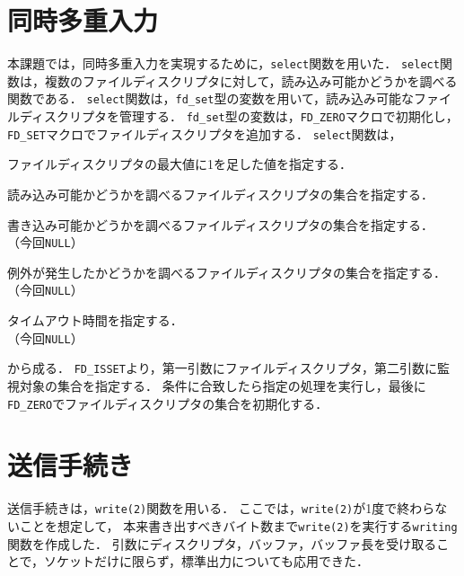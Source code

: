 \documentclass[12pt]{jlreq}
\begin{document}
\section*{同時多重入力}
本課題では，同時多重入力を実現するために，\texttt{select}関数を用いた．
\texttt{select}関数は，複数のファイルディスクリプタに対して，読み込み可能かどうかを調べる関数である．
\texttt{select}関数は，\texttt{fd\_set}型の変数を用いて，読み込み可能なファイルディスクリプタを管理する．
\texttt{fd\_set}型の変数は，\texttt{FD\_ZERO}マクロで初期化し，\texttt{FD\_SET}マクロでファイルディスクリプタを追加する．
\texttt{select}関数は，
\begin{description}
    \newcommand{\nulll}{（今回\texttt{NULL}）}
    \item [第1引数]ファイルディスクリプタの最大値に1を足した値を指定する．
    \item [第2引数]読み込み可能かどうかを調べるファイルディスクリプタの集合を指定する．
    \item [第3引数]書き込み可能かどうかを調べるファイルディスクリプタの集合を指定する．\\\nulll
    \item [第4引数]例外が発生したかどうかを調べるファイルディスクリプタの集合を指定する．\\\nulll
    \item [第5引数]タイムアウト時間を指定する．\\\nulll
\end{description}
から成る．
\texttt{FD\_ISSET}より，第一引数にファイルディスクリプタ，第二引数に監視対象の集合を指定する．
条件に合致したら指定の処理を実行し，最後に\texttt{FD\_ZERO}でファイルディスクリプタの集合を初期化する．

\section*{送信手続き}
送信手続きは，\texttt{write(2)}関数を用いる．
ここでは，\texttt{write(2)}が1度で終わらないことを想定して，
本来書き出すべきバイト数まで\texttt{write(2)}を実行する\texttt{writing}関数を作成した．
引数にディスクリプタ，バッファ，バッファ長を受け取ることで，ソケットだけに限らず，標準出力についても応用できた．
\end{document}
